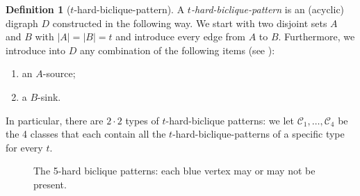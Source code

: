 \documentclass[a4paper,11pt]{article}
\theoremstyle{plain}
\newtheorem{identification rule}{Identification Rule}
\theoremstyle{definition}
\newtheorem{definition}[theorem]{Definition}
\theoremstyle{remark}
\newcommand{\hardbiclique}[1]{$#1$-hard-biclique-pattern}
\begin{document}
\begin{definition}[\hardbiclique{t}]
  \label{def:cleanedbiclique}
A \emph{\hardbiclique{t}} is an (acyclic) digraph $D$ constructed in the following way. We start with two disjoint sets $A$ and $B$ with  $|A| = |B| = t$ and introduce every edge from $A$ to $B$. Furthermore, we introduce into $D$ any combination of the following items (see ): 
\begin{enumerate}
\item an $A$-source;
\item a $B$-sink.
\end{enumerate}
In particular, there are $2 \cdot 2$ types of $t$-hard-biclique patterns: we let $\mathcal{C}_1,\ldots,\mathcal{C}_4$ be the 4 classes that each contain all the $t$-hard-biclique-patterns of a specific type for every $t$.
\end{definition}

\begin{figure}
\centering
{}
\caption{The 5-hard biclique patterns: each blue vertex may  or may not be present.}
\label{fig:cleanedbiclique}
\end{figure}
\end{document}
